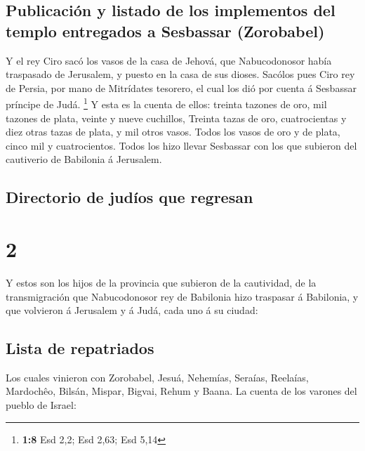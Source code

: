 \hypertarget{publicaciuxf3n-y-listado-de-los-implementos-del-templo-entregados-a-sesbassar-zorobabel}{%
\subsection{Publicación y listado de los implementos del templo
entregados a Sesbassar
(Zorobabel)}\label{publicaciuxf3n-y-listado-de-los-implementos-del-templo-entregados-a-sesbassar-zorobabel}}

 Y el rey Ciro sacó los vasos de la casa de Jehová, que
Nabucodonosor había traspasado de Jerusalem, y puesto en la casa de sus
dioses.  Sacólos pues Ciro rey de Persia, por mano de
Mitrídates tesorero, el cual los dió por cuenta á Sesbassar príncipe de
Judá. \footnote{\textbf{1:8} Esd 2,2; Esd 2,63; Esd 5,14} 
Y esta es la cuenta de ellos: treinta tazones de oro, mil tazones de
plata, veinte y nueve cuchillos,  Treinta tazas de oro,
cuatrocientas y diez otras tazas de plata, y mil otros vasos.
 Todos los vasos de oro y de plata, cinco mil y
cuatrocientos. Todos los hizo llevar Sesbassar con los que subieron del
cautiverio de Babilonia á Jerusalem.

\hypertarget{directorio-de-juduxedos-que-regresan}{%
\subsection{Directorio de judíos que
regresan}\label{directorio-de-juduxedos-que-regresan}}

\hypertarget{section-1}{%
\section{2}\label{section-1}}

 Y estos son los hijos de la provincia que subieron de la
cautividad, de la transmigración que Nabucodonosor rey de Babilonia hizo
traspasar á Babilonia, y que volvieron á Jerusalem y á Judá, cada uno á
su ciudad:

\hypertarget{lista-de-repatriados}{%
\subsection{Lista de repatriados}\label{lista-de-repatriados}}

 Los cuales vinieron con Zorobabel, Jesuá, Nehemías,
Seraías, Reelaías, Mardochêo, Bilsán, Mispar, Bigvai, Rehum y Baana. La
cuenta de los varones del pueblo de Israel:

